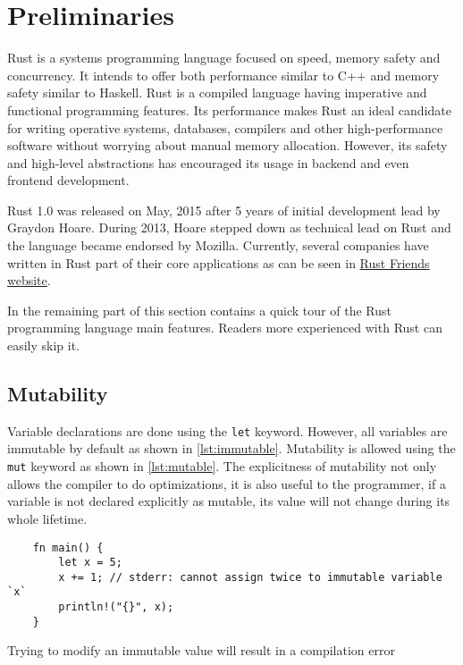 \chapter{Preliminaries}
\label{chapter:preliminaries}

Rust is a systems programming language focused on speed, memory safety and concurrency. It intends to offer both performance similar to C++ and memory safety similar to Haskell. Rust is a compiled language having imperative and functional programming features. Its performance makes Rust an ideal candidate for writing operative systems, databases, compilers and other high-performance software without worrying about manual memory allocation. However, its safety and high-level abstractions has encouraged its usage in backend and even frontend development. 

Rust 1.0 was released on May, 2015 after 5 years of initial development lead by Graydon Hoare. During 2013, Hoare stepped down as technical lead on Rust and the language became endorsed by Mozilla. Currently, several companies have written in Rust part of their core applications as can be seen in \href{https://www.rust-lang.org/en-US/friends.html}{Rust Friends website}.

In the remaining part of this section contains a quick tour of the Rust programming language main features. Readers more experienced with Rust can easily skip it.

\section{Mutability}
Variable declarations are done using the \texttt{let} keyword. However, all variables are immutable by default as shown in \ref{lst:immutable}. Mutability is allowed using the \texttt{mut} keyword as shown in \ref{lst:mutable}. The explicitness of mutability not only allows the compiler to do optimizations, it is also useful to the programmer, if a variable is not declared explicitly as mutable, its value will not change during its whole lifetime.

\begin{listing}
	\begin{verbatim}
    fn main() {
        let x = 5;
        x += 1; // stderr: cannot assign twice to immutable variable `x`
        println!("{}", x);
    }
	\end{verbatim}
  \caption{Trying to modify an immutable value will result in a compilation error}
  \label{lst:immutable}
\end{listing}

